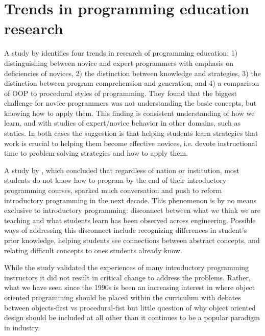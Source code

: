 \documentclass[12pt]{article}
\begin{document}
\section{Trends in programming education research}
A \citeyear{robins_learning_2003} study by
\citeauthor{robins_learning_2003} identifies four trends in research
of programming education: 1) distinguishing between novice and expert
programmers with emphasis on deficiencies of novices, 2) the
distinction between knowledge and strategies, 3) the distinction
between program comprehension and generation, and 4) a comparison of
OOP to procedural styles of
programming\autocite{robins_learning_2003}. They found that the
biggest challenge for novice programmers was not understanding the
basic concepts, but knowing how to apply them. This finding is
consistent understanding of how we
learn\autocite{bransford_how_2000,ambrose_chapter_2010}, and with
studies of expert/novice behavior in other domains, such as
statics\autocite{litzinger_cognitive_2010}. In both cases the
suggestion is that helping students learn strategies that work is
crucial to helping them become effective novices, i.e. devote
instructional time to problem-solving strategies and how to apply
them.

A \citeyear{mccracken_multinational_2001} study by
\citeauthor{mccracken_multinational_2001}\autocite{mccracken_multinational_2001},
which concluded that regardless of nation or institution, most
students do not know how to program by the end of their introductory
programming courses, sparked much conversation and push to reform
introductory programming in the next decade. This phenomenon is by no
means exclusive to introductory programming: disconnect between what
we think we are teaching and what students learn has been observed
across
engineering\autocite{streveler_learning_2008,flynn_engineering_2014}. Possible
ways of addressing this disconnect include recognizing differences in
student's prior knowledge, helping students see connections between
abstract concepts, and relating difficult concepts to ones students
already know\autocite{streveler_learning_2008,slotta_helping_2006}.

While the \citeauthor{mccracken_multinational_2001} study validated the
experiences of many introductory programming instructors it did not
result in critical change to address the problems. Rather, what we
have seen since the 1990s is been an increasing interest in where
object oriented programming should be placed within the curriculum
with debates between objects-first vs procedural-fist but little
question of why object oriented design should be included at all other
than it continues to be a popular paradigm in industry.
\end{document}
